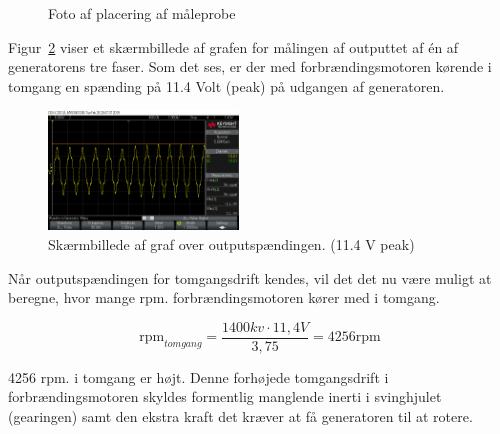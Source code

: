 \begin{figure}[!htb]
\begin{minipage}{0.5\textwidth}
  \caption{Foto af placering af måleprobe}
  \label{fig:testsetup2}
    \end{minipage}
\end{figure}



Figur~\ref{fig:scope1} viser et skærmbillede af grafen for målingen af outputtet af én af generatorens tre faser.  
Som det ses, er der med forbrændingsmotoren kørende i tomgang en spænding på 11.4 Volt (peak) på udgangen af generatoren. 

\begin{figure}[h]
  \centering
  \includegraphics[width=0.45\textwidth]{scope0.png}
  \caption{Skærmbillede af graf over outputspændingen. (11.4 V peak)}
  \label{fig:scope1}
\end{figure}

Når outputspændingen for tomgangsdrift kendes, vil det det nu være muligt at beregne, hvor mange rpm. forbrændingsmotoren kører med i tomgang.

\begin{equation}
  \label{eq:1}
  \mathrm{rpm}_{tomgang}=\frac{1400kv\cdot 11,4V}{3,75}=4256 \mathrm{rpm}
\end{equation}

4256 rpm. i tomgang er højt. Denne forhøjede tomgangsdrift i forbrændingsmotoren skyldes formentlig manglende inerti i svinghjulet (gearingen) samt den ekstra kraft det kræver at få generatoren til at rotere.

